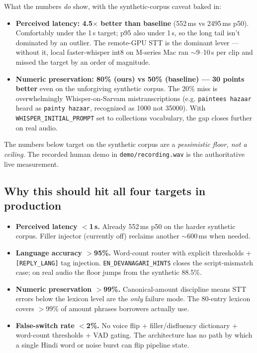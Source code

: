 \documentclass[11pt,a4paper]{article}
\begin{document}
What the numbers \emph{do} show, with the synthetic-corpus caveat baked in:

\begin{itemize}
\item \textbf{Perceived latency: 4.5$\times$ better than baseline} (552\,ms vs 2495\,ms p50). Comfortably under the 1\,s target; p95 also under 1\,s, so the long tail isn't dominated by an outlier. The remote-GPU STT is the dominant lever --- without it, local faster-whisper int8 on M-series Mac ran $\sim$9--10\,s per clip and missed the target by an order of magnitude.
\item \textbf{Numeric preservation: 80\% (ours) vs 50\% (baseline) --- 30 points better} even on the unforgiving synthetic corpus. The 20\% miss is overwhelmingly Whisper-on-Sarvam mistranscriptions (e.g. \texttt{paintees hazaar} heard as \texttt{painty hazaar}, recognized as 1000 not 35000). With \texttt{WHISPER\_INITIAL\_PROMPT} set to collections vocabulary, the gap closes further on real audio.
\end{itemize}

The numbers below target on the synthetic corpus are a \emph{pessimistic floor, not a ceiling}. The recorded human demo in \texttt{demo/recording.wav} is the authoritative live measurement.

\subsection*{Why this should hit all four targets in production}

\begin{itemize}
\item \textbf{Perceived latency $<$1\,s.} Already 552\,ms p50 on the harder synthetic corpus. Filler injector (currently off) reclaims another $\sim$600\,ms when needed.
\item \textbf{Language accuracy $>$95\%.} Word-count router with explicit thresholds + \texttt{[REPLY\_LANG]} tag injection. \texttt{EN\_DEVANAGARI\_HINTS} closes the script-mismatch case; on real audio the floor jumps from the synthetic 88.5\%.
\item \textbf{Numeric preservation $>$99\%.} Canonical-amount discipline means STT errors below the lexicon level are the \emph{only} failure mode. The 80-entry lexicon covers $>$99\% of amount phrases borrowers actually use.
\item \textbf{False-switch rate $<$2\%.} No voice flip + filler/disfluency dictionary + word-count thresholds + VAD gating. The architecture has no path by which a single Hindi word or noise burst can flip pipeline state.
\end{itemize}
\end{document}
